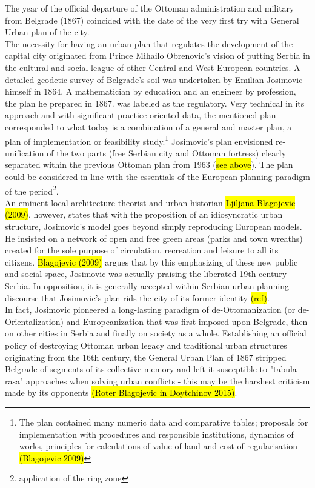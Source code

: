 \documentclass[11pt]{report}
\begin{document}
The year of the official departure of the Ottoman administration and military from Belgrade (1867) coincided with the date of the very first try with General Urban plan of the city.
\\
The necessity for having an urban plan that regulates the development of the capital city originated from Prince Mihailo Obrenovic's vision of putting Serbia in the cultural and social league of other Central and West European countries.
A detailed geodetic survey of Belgrade's soil was undertaken by Emilian Josimovic himself in 1864.
A mathematician by education and an engineer by profession, the plan he prepared in 1867. was labeled as the regulatory.
Very technical in its approach and with significant practice-oriented data, the mentioned plan corresponded to what today is a combination of a general and master plan, a plan of implementation or feasibility study.\footnote{The plan contained many numeric data and comparative tables; proposals  for  implementation with procedures and responsible institutions, dynamics of works, principles for calculations of value of land and cost of regularisation \hl{(Blagojevic 2009)}}
Josimovic's plan envisioned re-unification of the two parts (free Serbian city and Ottoman fortress) clearly separated within the previous Ottoman plan from 1963 (\hl{see above}). The plan could be considered in line with the essentials of the European planning paradigm of the period\footnote{application of the ring zone}. 
\\
An eminent local architecture theorist and urban historian \hl{Ljiljana Blagojevic (2009)}, however, states that with the proposition of an idiosyncratic urban structure, Josimovic's model goes beyond simply reproducing European models.
He insisted on a network of open and free green areas (parks and town wreaths) created for the sole purpose of circulation, recreation and leisure to all its citizens. \hl{Blagojevic (2009)} argues that by this emphasizing of  these new public and social space, Josimovic was actually praising the liberated 19th century Serbia.
In opposition, it is generally accepted within Serbian urban planning discourse that Josimovic's plan rids the city of its former identity \hl{(ref)}.
\\
In fact, Josimovic pioneered a long-lasting paradigm of de-Ottomanization (or de-Orientalization) and Europeanization that was first imposed upon Belgrade, then on other cities in Serbia and finally on society as a whole. Establishing an official policy of destroying Ottoman urban legacy and traditional urban structures originating from the 16th century, the General Urban Plan of 1867 stripped Belgrade of segments of its collective memory and left it susceptible to "tabula rasa" approaches when solving urban conflicts - this may be the harshest criticism made by its opponents \hl{(Roter Blagojevic in Doytchinov 2015)}.
\end{document}
